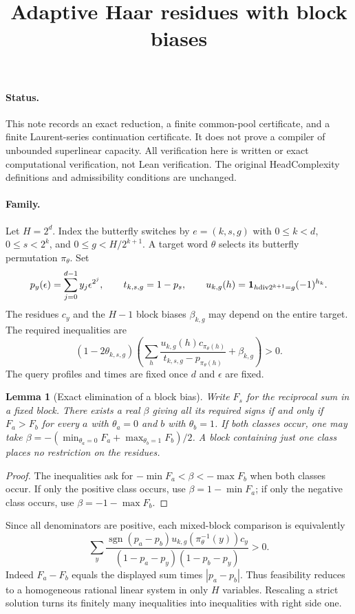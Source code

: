 \documentclass[11pt]{article}
\title{Adaptive Haar residues with block biases}
\author{}
\date{}
\newtheorem{lemma}{Lemma}
\begin{document}
\maketitle

\paragraph{Status.}
This note records an exact reduction, a finite common-pool certificate,
and a finite Laurent-series continuation certificate. It does not prove
a compiler of unbounded superlinear capacity. All verification here is
written or exact computational verification, not Lean verification.
The original HeadComplexity definitions and admissibility conditions
are unchanged.

\paragraph{Family.}
Let $H=2^d$. Index the butterfly switches by
$e=(k,s,g)$ with $0\leq k<d$, $0\leq s<2^k$, and
$0\leq g<H/2^{k+1}$. A target word $\theta$ selects its butterfly
permutation $\pi_\theta$. Set
\[
 p_y(\epsilon)=\sum_{j=0}^{d-1}y_j\epsilon^{2^j},\qquad
 t_{k,s,g}=1-p_s,\qquad
 u_{k,g}(h)={\bf1}_{h\mathbin{\mathrm{div}}2^{k+1}=g}(-1)^{h_k}.
\]
The residues $c_y$ and the $H-1$ block biases $\beta_{k,g}$ may depend
on the entire target. The required inequalities are
\[
 (1-2\theta_{k,s,g})\left(
 \sum_h\frac{u_{k,g}(h)c_{\pi_\theta(h)}}{t_{k,s,g}-p_{\pi_\theta(h)}}
 +\beta_{k,g}\right)>0.                                      \tag{1}
\]
The query profiles and times are fixed once $d$ and $\epsilon$ are fixed.

\begin{lemma}[Exact elimination of a block bias]
Write $F_s$ for the reciprocal sum in a fixed block. There exists a real
$\beta$ giving all its required signs if and only if
$F_a>F_b$ for every $a$ with $\theta_a=0$ and $b$ with $\theta_b=1$.
If both classes occur, one may take
$\beta=-(\min_{\theta_a=0}F_a+\max_{\theta_b=1}F_b)/2$.
A block containing just one class places no restriction on the residues.
\end{lemma}
\begin{proof}
The inequalities ask for $-\min F_a<\beta<-\max F_b$ when both
classes occur. If only the positive class occurs, use
$\beta=1-\min F_a$; if only the negative class occurs, use
$\beta=-1-\max F_b$.
\end{proof}

Since all denominators are positive, each mixed-block comparison is
equivalently
\[
 \sum_y \frac{\operatorname{sgn}(p_a-p_b)
        u_{k,g}(\pi_\theta^{-1}(y))c_y}
 {(1-p_a-p_y)(1-p_b-p_y)}>0.                                  \tag{2}
\]
Indeed $F_a-F_b$ equals the displayed sum times $|p_a-p_b|$.
Thus feasibility reduces to a homogeneous rational linear system in
only $H$ variables. Rescaling a strict solution turns its finitely many
inequalities into inequalities with right side one.
\end{document}
